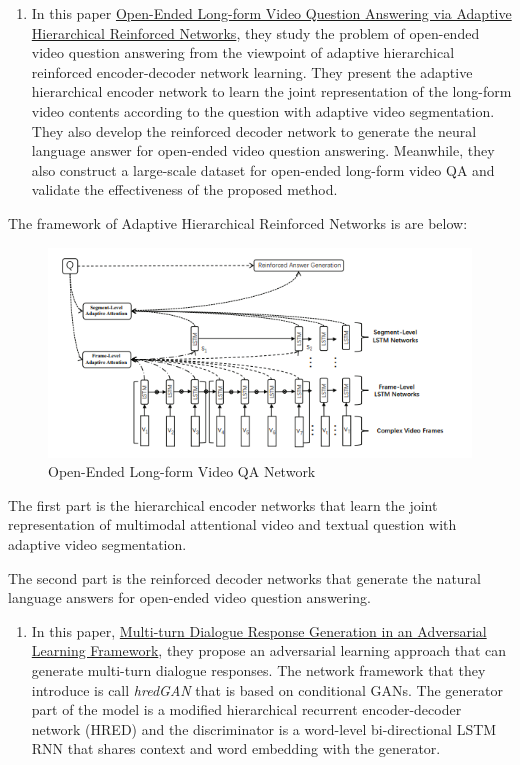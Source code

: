 \documentclass[]{book}
\providecommand{\tightlist}{%
  \setlength{\itemsep}{0pt}\setlength{\parskip}{0pt}}
\theoremstyle{definition}
\theoremstyle{definition}
\theoremstyle{definition}
\theoremstyle{remark}
\begin{document}
\begin{enumerate}
\def\labelenumi{\arabic{enumi}.}
\setcounter{enumi}{1}
\tightlist
\item
  In this paper
  \href{https://www.ijcai.org/proceedings/2018/0512.pdf}{Open-Ended
  Long-form Video Question Answering via Adaptive Hierarchical
  Reinforced Networks}, they study the problem of open-ended video
  question answering from the viewpoint of adaptive hierarchical
  reinforced encoder-decoder network learning. They present the adaptive
  hierarchical encoder network to learn the joint representation of the
  long-form video contents according to the question with adaptive video
  segmentation. They also develop the reinforced decoder network to
  generate the neural language answer for open-ended video question
  answering. Meanwhile, they also construct a large-scale dataset for
  open-ended long-form video QA and validate the effectiveness of the
  proposed method.
\end{enumerate}

The framework of Adaptive Hierarchical Reinforced Networks is are below:

\begin{figure}
\centering
\includegraphics{img/oe.png}
\caption{Open-Ended Long-form Video QA Network}
\end{figure}

The first part is the hierarchical encoder networks that learn the joint
representation of multimodal attentional video and textual question with
adaptive video segmentation.

The second part is the reinforced decoder networks that generate the
natural language answers for open-ended video question answering.

\begin{enumerate}
\def\labelenumi{\arabic{enumi}.}
\setcounter{enumi}{2}
\tightlist
\item
  In this paper, \href{https://arxiv.org/pdf/1805.11752.pdf}{Multi-turn
  Dialogue Response Generation in an Adversarial Learning Framework},
  they propose an adversarial learning approach that can generate
  multi-turn dialogue responses. The network framework that they
  introduce is call \emph{hredGAN} that is based on conditional GANs.
  The generator part of the model is a modified hierarchical recurrent
  encoder-decoder network (HRED) and the discriminator is a word-level
  bi-directional LSTM RNN that shares context and word embedding with
  the generator.
\end{enumerate}
\end{document}
